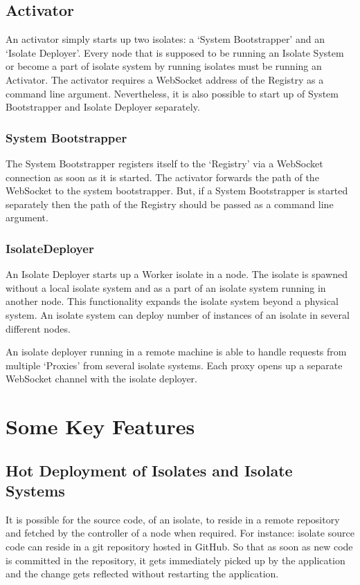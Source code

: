 \subsection{Activator}
  An activator simply starts up two isolates: a ‘System Bootstrapper’ and an ‘Isolate Deployer’. Every node that is supposed to be running an Isolate System or become a part of isolate system by running isolates must be running an Activator. The activator requires a WebSocket address of the Registry as a command line argument. Nevertheless, it is also possible to start up of System Bootstrapper and Isolate Deployer separately.

  \subsubsection{System Bootstrapper}
  The System Bootstrapper registers itself to the ‘Registry’ via a WebSocket connection as soon as it is started. The activator forwards the path of the WebSocket to the system bootstrapper. But, if a System Bootstrapper is started separately then the path of the Registry should be passed as a command line argument.

  \subsubsection{IsolateDeployer}
An Isolate Deployer starts up a Worker isolate in a node. The isolate is spawned without a local isolate system and as a part of an isolate system running in another node. This functionality expands the isolate system beyond a physical system. An isolate system can deploy number of instances of an isolate in several different nodes.

  An isolate deployer running in a remote machine is able to handle requests from multiple ‘Proxies’ from several isolate systems. Each proxy opens up a separate WebSocket channel with the isolate deployer.

\section{Some Key Features}
\subsection{Hot Deployment of Isolates and Isolate Systems}
It is possible for the source code, of an isolate, to reside in a remote repository and fetched by the controller of a node when required. For instance: isolate source code can reside in a git repository hosted in GitHub. So that as soon as new code is committed in the repository, it gets immediately picked up by the application and the change gets reflected without restarting the application.

